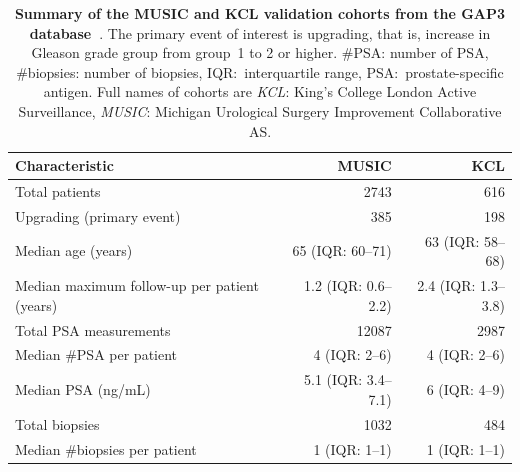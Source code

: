 \begin{table}
\small\sf\centering
\caption{\textbf{Summary of the MUSIC and KCL validation cohorts from the GAP3 database~\citep{gap3_2018}}. The primary event of interest is upgrading, that is, increase in Gleason grade group from group~1 to 2 or higher. \#PSA: number of PSA, \#biopsies: number of biopsies, IQR:~interquartile range, PSA:~prostate-specific antigen. Full names of cohorts are \textit{KCL}: King's College London Active Surveillance, \textit{MUSIC}: Michigan Urological Surgery Improvement Collaborative AS.}
\label{table:gap3_summary_3}
\begin{tabular}{lrr}
\hline
\textbf{Characteristic} & \textbf{MUSIC} & \textbf{KCL}\\
\hline
Total patients & 2743 & 616\\
Upgrading (primary event) & 385 & 198\\
\hline
Median age (years) & 65 (IQR: 60--71) & 63 (IQR: 58--68)\\
Median maximum follow-up per patient (years) & 1.2 (IQR: 0.6--2.2) & 2.4 (IQR: 1.3--3.8)\\
Total PSA measurements & 12087 & 2987\\
Median \#PSA per patient & 4 (IQR: 2--6) & 4 (IQR: 2--6)\\
Median PSA (ng/mL) & 5.1 (IQR: 3.4--7.1) & 6 (IQR: 4--9)\\
Total biopsies & 1032 & 484\\
Median \#biopsies per patient & 1 (IQR: 1--1) & 1 (IQR: 1--1)\\
\hline
\end{tabular}
\end{table}

